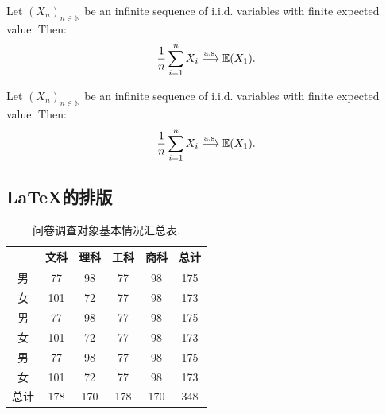 \begin{multicols}{2}
\lipsum[1]
\end{multicols}  

\begin{theo}
		Let $(X_n)_{n\in \mathbb{N}}$ be an infinite sequence of i.i.d. variables with finite expected value. Then:
		$$\frac{1}{n} \sum_{i=1}^n X_i \overset{\textnormal{a.s.}}{\longrightarrow}
		\mathbb{E} (X_1) .$$
\end{theo}

\begin{theo}
	Let $(X_n)_{n\in \mathbb{N}}$ be an infinite sequence of i.i.d. variables with finite expected value. Then:
	$$\frac{1}{n} \sum_{i=1}^n X_i \overset{\textnormal{a.s.}}{\longrightarrow}
	\mathbb{E} (X_1) .$$
\end{theo}


\begin{multicols}{2}
	\lipsum[1]
\end{multicols}  

\subsection{\LaTeX{}的排版}
\begin{multicols}{2}
	\lipsum[1]
\end{multicols}  

\begin{table}[!htbp]  
	\centering  
	\begin{tabular}{cccccc}  
		\arrayrulecolor{tabcolor} 
		\toprule[1.4pt]   
		     &文科 & 理科 & 工科 & 商科 & 总计 \\  
		\hline  
		男& 77 & 98 & 77 & 98 & 175 \\  
		女& 101 & 72 & 77 & 98 & 173 \\  
		男& 77 & 98 &  77 & 98 &175 \\  
		女& 101 & 72 & 77 & 98 & 173 \\  
		男& 77 & 98 &  77 & 98 &175 \\  
		女& 101 & 72 &  77 & 98 &173 \\  
		总计& 178 & 170 & 178 & 170 &348 \\  
		\bottomrule[1.4pt]  
	\end{tabular}  
	\caption {问卷调查对象基本情况汇总表.}  
	\label{tab:number}  
\end{table}  

